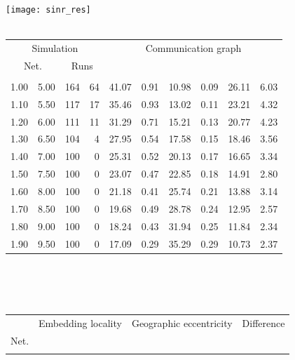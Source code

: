 \documentclass{article}
\begin{document}
\begin{figure}[h]
\begin{center}
\texttt{[image: sinr\_res]}
~\\~\\
\begin{tabular}{|rr|rr|rr|rr|rr|}
\hline
\multicolumn{4}{|c|}{Simulation} & \multicolumn{6}{|c|}{Communication graph}\\
\multicolumn{2}{|c}{Net.} & \multicolumn{2}{c|}{Runs} & \multicolumn{2}{|c}{} & \multicolumn{2}{c}{} & \multicolumn{2}{c|}{}\\
\hline
\multicolumn{1}{|c}{} & \multicolumn{1}{c|}{} & \multicolumn{1}{|c}{} & \multicolumn{1}{c|}{} & \multicolumn{1}{|c}{} & \multicolumn{1}{c|}{} & \multicolumn{1}{|c}{} & \multicolumn{1}{c|}{} & \multicolumn{1}{|c}{} & \multicolumn{1}{c|}{}\\
1.00 & 5.00 & 164 & 64 & 41.07 & 0.91 & 10.98 & 0.09 & 26.11 & 6.03\\
1.10 & 5.50 & 117 & 17 & 35.46 & 0.93 & 13.02 & 0.11 & 23.21 & 4.32\\
1.20 & 6.00 & 111 & 11 & 31.29 & 0.71 & 15.21 & 0.13 & 20.77 & 4.23\\
1.30 & 6.50 & 104 &  4 & 27.95 & 0.54 & 17.58 & 0.15 & 18.46 & 3.56\\
1.40 & 7.00 & 100 &  0 & 25.31 & 0.52 & 20.13 & 0.17 & 16.65 & 3.34\\
1.50 & 7.50 & 100 &  0 & 23.07 & 0.47 & 22.85 & 0.18 & 14.91 & 2.80\\
1.60 & 8.00 & 100 &  0 & 21.18 & 0.41 & 25.74 & 0.21 & 13.88 & 3.14\\
1.70 & 8.50 & 100 &  0 & 19.68 & 0.49 & 28.78 & 0.24 & 12.95 & 2.57\\
1.80 & 9.00 & 100 &  0 & 18.24 & 0.43 & 31.94 & 0.25 & 11.84 & 2.34\\
1.90 & 9.50 & 100 &  0 & 17.09 & 0.29 & 35.29 & 0.29 & 10.73 & 2.37\\
\hline
\end{tabular}\\
~\\~\\
\begin{tabular}{|r|rr|rr|rr|rr|rr|}
\hline
& \multicolumn{4}{|c|}{Embedding locality} & \multicolumn{4}{|c|}{Geographic eccentricity} & \multicolumn{2}{|c|}{Difference}\\
Net. & \multicolumn{2}{c}{} & \multicolumn{2}{c|}{} & \multicolumn{2}{c}{} & \multicolumn{2}{c|}{}&  & \\
\hline
\multicolumn{1}{|c|}{} & \multicolumn{1}{|c}{} & \multicolumn{1}{c|}{} & \multicolumn{1}{|c}{} & \multicolumn{1}{c|}{} & \multicolumn{1}{|c}{} & \multicolumn{1}{c|}{} & \multicolumn{1}{|c}{} & \multicolumn{1}{c|}{} & \multicolumn{1}{|c}{} & \multicolumn{1}{c|}{}\\

\end{tabular}
\end{center}
\end{figure}
\end{document}
